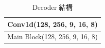 \documentclass[10pt,twocolumn,letterpaper]{article}
\begin{document}
\begin{CJK}{UTF8}{bkai}
   \begin{table}
      \caption{Decoder 結構\label{table:Decoder}}
      \begin{center}
         \begin{tabular}{ c c }
            \hline
            \multicolumn{2}{c}{Conv1d(128, 256, 9, 16, 8)}     \\
            \hline
            \multicolumn{2}{c}{Main Block(128, 256, 9, 16, 8)} \\
            \hline
         \end{tabular}
      \end{center}
   \end{table}

\end{CJK}
\end{document}

